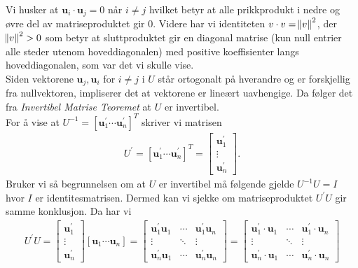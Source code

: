 \documentclass[12pt,
               a4paper,
               article,
               oneside,
               oldfontcommands,
               norsk]{memoir}
\begin{document}
Vi husker at $\boldsymbol{u}_i  \cdot \boldsymbol{u}_j= 0$ når $i \neq j$ hvilket betyr at alle prikkprodukt i nedre og øvre del av matriseproduktet gir $0$. Videre har vi identiteten $v \cdot v = \norm{v}^{2}$, der $\norm{v}^{2} > 0$ som betyr at sluttproduktet gir en diagonal matrise (kun null entrier alle steder utenom hoveddiagonalen) med positive koeffisienter langs hoveddiagonalen, som var det vi skulle vise. \vspace{4mm}\\
Siden vektorene $\boldsymbol{u}_j,  \boldsymbol{u}_i$ for $i \neq j$ i $U$ står ortogonalt på hverandre og er forskjellig fra nullvektoren, impliserer det at vektorene er lineært uavhengige. Da følger det fra \emph{Invertibel Matrise Teoremet} at $U$ er invertibel. \vspace{4mm}\\
For å vise at $U^{-1} = \left[\boldsymbol{u}_{1}^{'} \cdots \boldsymbol{u}_{n}^{'}\right]^{T}$ skriver vi matrisen 
\begin{align*}
U^{'} = \left[\boldsymbol{u}_{1}^{'} \cdots \boldsymbol{u}_{n}^{'}\right]^{T} = \begin{bmatrix}
\boldsymbol{u}_{1}^{'}\\
\vdots \\
\boldsymbol{u}_{n}^{'}
\end{bmatrix}.
\end{align*}
Bruker vi så begrunnelsen om at $U$ er invertibel må følgende gjelde $U^{-1}U = I$ hvor $I$ er identitesmatrisen. Dermed kan vi sjekke om matriseproduktet $U^{'}U$ gir samme konklusjon. Da har vi
\begin{align*}
U^{'}U = 
\begin{bmatrix}
	\boldsymbol{u}_{1}^{'}\\
	\vdots \\
	\boldsymbol{u}_{n}^{'}
\end{bmatrix} \left[ \boldsymbol{u}_1 \cdots \boldsymbol{u}_n \right]
=
\begin{bmatrix}
	\boldsymbol{u}_{1}^{'} \boldsymbol{u}_{1} &\cdots & \boldsymbol{u}_{1}^{'} \boldsymbol{u}_n\\
	\vdots &\ddots & \vdots \\	
	\boldsymbol{u}_{n}^{'}\boldsymbol{u}_1 &\cdots &\boldsymbol{u}_{n}^{'}\boldsymbol{u}_n 
\end{bmatrix}
=
\begin{bmatrix}
	\boldsymbol{u}_{1}^{'} \cdot \boldsymbol{u}_{1} &\cdots & 							\boldsymbol{u}_{1}^{'} \cdot \boldsymbol{u}_n \\
	\vdots &\ddots & \vdots \\	
	\boldsymbol{u}_{n}^{'} \cdot \boldsymbol{u}_1 &\cdots &							\boldsymbol{u}_{n}^{'} \cdot \boldsymbol{u}_n 
\end{bmatrix}
\end{align*}
\end{document}
